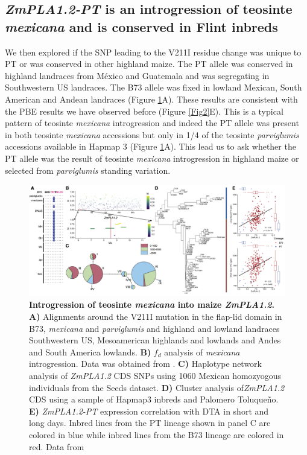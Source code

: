 \documentclass[9pt,twocolumn,twoside,lineno]{BioRxiv}
\begin{document}
\subsection{\textit{ZmPLA1.2-PT} is an introgression of teosinte \textit{mexicana} and is conserved in Flint inbreds} 
We then explored if the SNP leading to the V211I residue change was unique to PT or was conserved in other highland maize.
The PT allele was conserved in highland landraces from México and Guatemala and was segregating in Southwestern US landraces. 
The B73 allele was fixed in lowland Mexican, South American and Andean landraces (Figure \ref{Fig6}A). 
These results are consistent with the PBE results we have observed before (Figure \ref{Fig2}E).
This is a typical pattern of teosinte \textit{mexicana} introgression \cite{Wang2020-mp} and indeed the PT allele was present in both teosinte \textit{mexicana} accessions but only in 1/4 of the teosinte \textit{parviglumis} accessions available in Hapmap 3 \cite{Bukowski2017-ng} (Figure \ref{Fig6}A). 
This lead us to ask whether the PT allele was the result of teosinte \textit{mexicana} introgression in highland maize or selected from \textit{parviglumis} standing variation.

\begin{figure}[!ht]
\begin{center}
\includegraphics[width=0.8\paperwidth]{Figures/Fig_6.png}
\caption{\textbf{Introgression of teosinte \textit{mexicana} into maize \textit{ZmPLA1.2}.}  
\textbf{A)} Alignments around the V211I mutation in the flap-lid domain in B73, \textit{mexicana} and \textit{parviglumis} and highland and lowland landraces Southwestern US, Mesoamerican highlands and lowlands and Andes and South America lowlands.
\textbf{B)} \(f_d\) analysis of \textit{mexicana} introgression. Data was obtained from \cite{Gonzalez-Segovia2019-jy}. 
\textbf{C)} Haplotype network analysis of \textit{ZmPLA1.2} CDS SNPs using 1060 Mexican homozyogous individuals from the Seeds dataset.
\textbf{D)} Cluster analysis of\textit{ZmPLA1.2} CDS using a sample of Hapmap3 inbreds and Palomero Toluqueño.
\textbf{E)} \textit{ZmPLA1.2-PT} expression correlation with DTA in short and long days. 
Inbred lines from the PT lineage shown in panel C are colored in blue while inbred lines from the B73 lineage are colored in red.
Data from \cite{Kremling2018-gn}}
\label{Fig6}
\end{center}
\end{figure}
\end{document}

